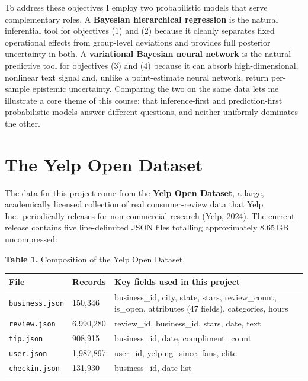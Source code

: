 \documentclass[10pt, letterpaper]{article}
\begin{document}
To address these objectives I employ two probabilistic models that serve complementary roles. A \textbf{Bayesian hierarchical regression} is the natural inferential tool for objectives (1) and (2) because it cleanly separates fixed operational effects from group-level deviations and provides full posterior uncertainty in both. A \textbf{variational Bayesian neural network} is the natural predictive tool for objectives (3) and (4) because it can absorb high-dimensional, nonlinear text signal and, unlike a point-estimate neural network, return per-sample epistemic uncertainty. Comparing the two on the same data lets me illustrate a core theme of this course: that inference-first and prediction-first probabilistic models answer different questions, and neither uniformly dominates the other.

\section{The Yelp Open Dataset}

The data for this project come from the \textbf{Yelp Open Dataset}, a large, academically licensed collection of real consumer-review data that Yelp Inc.\ periodically releases for non-commercial research (Yelp, 2024). The current release contains five line-delimited JSON files totalling approximately 8.65\,GB uncompressed:

\begin{center}\small
\textbf{Table 1.} Composition of the Yelp Open Dataset.\\[4pt]
\renewcommand{\arraystretch}{1.2}
\begin{tabular}{@{}llp{7cm}@{}}
\toprule
File & Records & Key fields used in this project \\
\midrule
\texttt{business.json} & 150,346 & business\_id, city, state, stars, review\_count, is\_open, attributes (47 fields), categories, hours \\
\texttt{review.json}   & 6,990,280 & review\_id, business\_id, stars, date, text \\
\texttt{tip.json}      & 908,915 & business\_id, date, compliment\_count \\
\texttt{user.json}     & 1,987,897 & user\_id, yelping\_since, fans, elite \\
\texttt{checkin.json}  & 131,930 & business\_id, date list \\
\bottomrule
\end{tabular}
\end{center}
\end{document}
